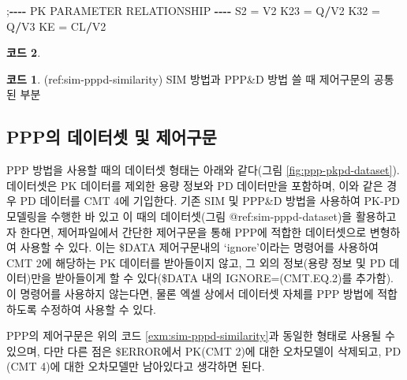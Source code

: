 \documentclass[
  10pt,
  krantz2,
  a4paper]{krantz}
\newenvironment{Shaded}{\begin{snugshade}}{\end{snugshade}}
\newcommand{\NormalTok}[1]{#1}
\newcommand{\OperatorTok}[1]{\textcolor[rgb]{0.81,0.36,0.00}{\textbf{#1}}}
\newcommand{\StringTok}[1]{\textcolor[rgb]{0.31,0.60,0.02}{#1}}
\theoremstyle{definition}
\theoremstyle{definition}
\newtheorem{example}{코드}[chapter]
\theoremstyle{definition}
\theoremstyle{remark}
\begin{document}
\begin{Shaded}
\begin{Highlighting}[]
\NormalTok{;}\OperatorTok{{-}{-}{-}{-}}\StringTok{ }\NormalTok{PK PARAMETER RELATIONSHIP }\OperatorTok{{-}{-}{-}{-}}
\StringTok{  }\NormalTok{S2   =}\StringTok{ }\NormalTok{V2}
\NormalTok{  K23  =}\StringTok{ }\NormalTok{Q}\OperatorTok{/}\NormalTok{V2}
\NormalTok{  K32  =}\StringTok{ }\NormalTok{Q}\OperatorTok{/}\NormalTok{V3}
\NormalTok{  KE   =}\StringTok{ }\NormalTok{CL}\OperatorTok{/}\NormalTok{V2}
\end{Highlighting}
\end{Shaded}

\begin{example}
\begin{example}

\protect\hypertarget{exm:sim-pppd-similarity}{}{\label{exm:sim-pppd-similarity} }(ref:sim-pppd-similarity) SIM 방법과 PPP\&D 방법 쓸 때 제어구문의 공통된 부분

\end{example}
\end{example}

\hypertarget{pppuxc758-uxb370uxc774uxd130uxc14b-uxbc0f-uxc81cuxc5b4uxad6cuxbb38}{%
\subsection{PPP의 데이터셋 및 제어구문}\label{pppuxc758-uxb370uxc774uxd130uxc14b-uxbc0f-uxc81cuxc5b4uxad6cuxbb38}}

PPP 방법을 사용할 때의 데이터셋 형태는 아래와 같다(그림 \ref{fig:ppp-pkpd-dataset}). 데이터셋은 PK 데이터를 제외한 용량 정보와 PD 데이터만을 포함하며, 이와 같은 경우 PD 데이터를 CMT 4에 기입한다. 기존 SIM 및 PPP\&D 방법을 사용하여 PK-PD 모델링을 수행한 바 있고 이 때의 데이터셋(그림 @ref:sim-pppd-dataset)을 활용하고자 한다면, 제어파일에서 간단한 제어구문을 통해 PPP에 적합한 데이터셋으로 변형하여 사용할 수 있다. 이는 \$DATA 제어구문내의 `ignore'이라는 명령어를 사용하여 CMT 2에 해당하는 PK 데이터를 받아들이지 않고, 그 외의 정보(용량 정보 및 PD 데이터)만을 받아들이게 할 수 있다(\$DATA 내의 IGNORE=(CMT.EQ.2)를 추가함). 이 명령어를 사용하지 않는다면, 물론 엑셀 상에서 데이터셋 자체를 PPP 방법에 적합하도록 수정하여 사용할 수 있다.

PPP의 제어구문은 위의 코드 \ref{exm:sim-pppd-similarity}과 동일한 형태로 사용될 수 있으며, 다만 다른 점은 \$ERROR에서 PK(CMT 2)에 대한 오차모델이 삭제되고, PD (CMT 4)에 대한 오차모델만 남아있다고 생각하면 된다.
\end{document}
